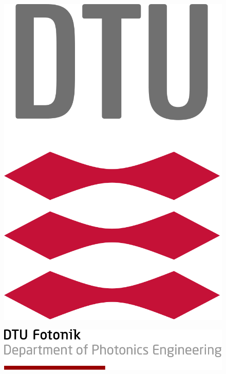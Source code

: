 \documentclass{memoir}
\title{
\noindent\makebox[\linewidth]{\rule{\textwidth}{1pt}} 
\textmd{\huge \textbf{\hmwkClass \\ \hmwkTitle}}\\
\large\vspace{0.1in}\hmwkDueDate\\
\vspace{0.1in}\large{\textit{\hmwkClassInstructor\ \hmwkClassTime}}
\noindent\makebox[\linewidth]{\rule{\textwidth}{1pt}} 
\vspace{1in}
}
\author{\large\textbf{\hmwkAuthorNamea} \\ \large\textbf{\hmwkAuthorNameb} \\ \large\textbf{\hmwkAuthorNamec} \\ \large\textbf{\hmwkAuthorName}}
\date{} %
\begin{document}
\begin{figure}
	\centering
	\includegraphics[scale=0.15]{dtulogo.png}
\end{figure}

\begin{figure}[!b]
	\includegraphics[scale=0.25]{dtufooter.png}
\end{figure}
\maketitle
\thispagestyle{empty}
\end{document}
